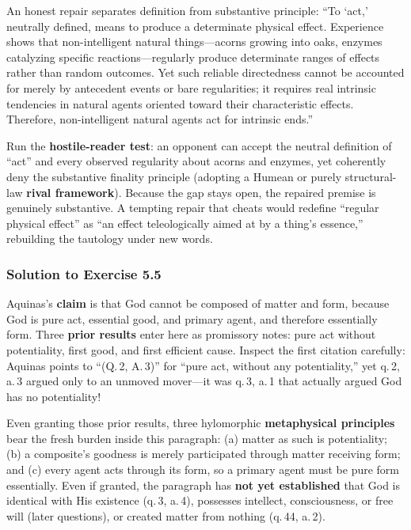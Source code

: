 An honest repair separates definition from substantive principle: ``To `act,' neutrally defined, means to produce a determinate physical effect. Experience shows that non-intelligent natural things---acorns growing into oaks, enzymes catalyzing specific reactions---regularly produce determinate ranges of effects rather than random outcomes. Yet such reliable directedness cannot be accounted for merely by antecedent events or bare regularities; it requires real intrinsic tendencies in natural agents oriented toward their characteristic effects. Therefore, non-intelligent natural agents act for intrinsic ends.''

Run the \textbf{hostile-reader test}: an opponent can accept the neutral definition of ``act'' and every observed regularity about acorns and enzymes, yet coherently deny the substantive finality principle (adopting a Humean or purely structural-law \textbf{rival framework}). Because the gap stays open, the repaired premise is genuinely substantive. A tempting repair that cheats would redefine ``regular physical effect'' as ``an effect teleologically aimed at by a thing's essence,'' rebuilding the tautology under new words.

\subsubsection*{Solution to Exercise 5.5}
Aquinas's \textbf{claim} is that God cannot be composed of matter and form, because God is pure act, essential good, and primary agent, and therefore essentially form. Three \textbf{prior results} enter here as promissory notes: pure act without potentiality, first good, and first efficient cause. Inspect the first citation carefully: Aquinas points to ``(Q.\,2, A.\,3)'' for ``pure act, without any potentiality,'' yet q.\,2, a.\,3 argued only to an unmoved mover---it was q.\,3, a.\,1 that actually argued God has no potentiality!

Even granting those prior results, three hylomorphic \textbf{metaphysical principles} bear the fresh burden inside this paragraph: (a) matter as such is potentiality; (b) a composite's goodness is merely participated through matter receiving form; and (c) every agent acts through its form, so a primary agent must be pure form essentially. Even if granted, the paragraph has \textbf{not yet established} that God is identical with His existence (q.\,3, a.\,4), possesses intellect, consciousness, or free will (later questions), or created matter from nothing (q.\,44, a.\,2).

